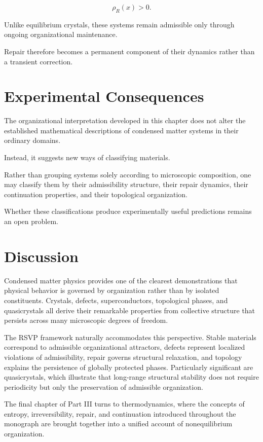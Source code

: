 \documentclass[11pt,oneside]{book}
\numberwithin{equation}{chapter}
\theoremstyle{definition}
\theoremstyle{plain}
\begin{document}
\[
\rho_R(x)>0.
\]

Unlike equilibrium crystals, these systems remain admissible only through
ongoing organizational maintenance.

Repair therefore becomes a permanent component of their dynamics rather than
a transient correction.

\section{Experimental Consequences}

The organizational interpretation developed in this chapter does not alter
the established mathematical descriptions of condensed matter systems in
their ordinary domains.

Instead, it suggests new ways of classifying materials.

Rather than grouping systems solely according to microscopic composition,
one may classify them by their admissibility structure, their repair
dynamics, their continuation properties, and their topological organization.

Whether these classifications produce experimentally useful predictions
remains an open problem.

\section{Discussion}

Condensed matter physics provides one of the clearest demonstrations that
physical behavior is governed by organization rather than by isolated
constituents. Crystals, defects, superconductors, topological phases, and
quasicrystals all derive their remarkable properties from collective
structure that persists across many microscopic degrees of freedom.

The RSVP framework naturally accommodates this perspective. Stable materials
correspond to admissible organizational attractors, defects represent
localized violations of admissibility, repair governs structural relaxation,
and topology explains the persistence of globally protected phases.
Particularly significant are quasicrystals, which illustrate that
long-range structural stability does not require periodicity but only the
preservation of admissible organization.

The final chapter of Part III turns to thermodynamics, where the concepts of
entropy, irreversibility, repair, and continuation introduced throughout the
monograph are brought together into a unified account of nonequilibrium
organization.
\end{document}

